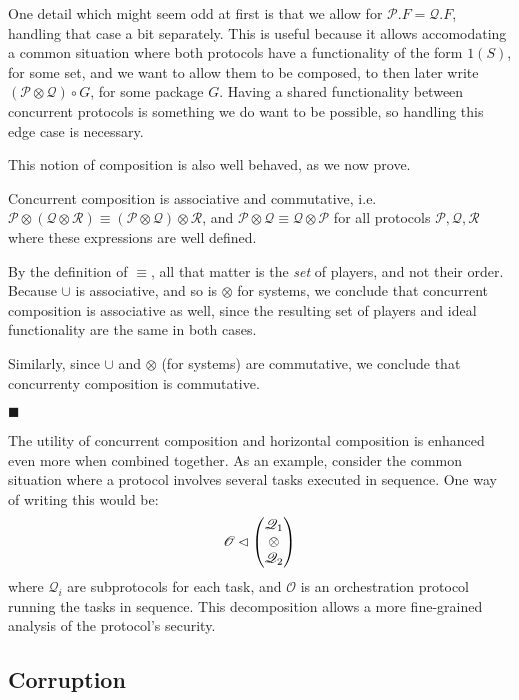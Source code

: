 One detail which might seem odd at first is that we allow
for $\mathscr{P}.F = \mathscr{Q}.F$, handling that case a bit separately.
This is useful because it allows accomodating a common situation
where both protocols have a functionality of the form $1(S)$,
for some set, and we want to allow them to be composed,
to then later write $(\mathscr{P} \otimes \mathscr{Q}) \circ G$,
for some package $G$.
Having a shared functionality between concurrent protocols
is something we do want to be possible, so handling
this edge case is necessary.

This notion of composition is also well behaved, as we now prove.

\begin{lemma}
Concurrent composition is associative and commutative,
i.e. $\mathscr{P} \otimes (\mathscr{Q} \otimes \mathscr{R}) \equiv (\mathscr{P} \otimes \mathscr{Q}) \otimes \mathscr{R}$,
and $\mathscr{P} \otimes \mathscr{Q} \equiv \mathscr{Q} \otimes \mathscr{P}$ for
all protocols $\mathscr{P}, \mathscr{Q}, \mathscr{R}$ where these expressions
are well defined.


By the definition of $\equiv$, all that matter is the \emph{set} of players,
and not their order.
Because $\cup$ is associative, and so is $\otimes$ for systems,
we conclude that concurrent composition is associative as well,
since the resulting set of players and ideal functionality are the same
in both cases.

Similarly, since $\cup$ and $\otimes$ (for systems) are commutative,
we conclude that concurrenty composition is commutative.

$\blacksquare$
\end{lemma}

The utility of concurrent composition and horizontal composition
is enhanced even more when combined together.
As an example, consider the common situation where a
protocol involves several tasks executed in sequence.
One way of writing this would be:
$$
\mathscr{O} \lhd
\begin{pmatrix}
  \mathscr{Q}_1\cr
  \otimes\cr
  \mathscr{Q}_2
\end{pmatrix}
$$
where $\mathscr{Q}_i$ are subprotocols for each task,
and $\mathscr{O}$ is an orchestration protocol running the tasks in sequence.
This decomposition allows a more fine-grained analysis of the protocol's
security.

\subsection{Corruption}

